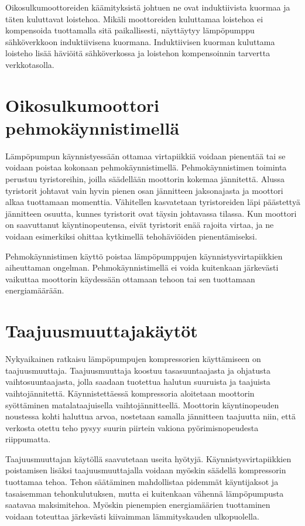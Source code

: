   Oikosulkumoottoreiden käämityksistä johtuen ne ovat induktiivista kuormaa ja täten kuluttavat loistehoa. Mikäli moottoreiden kuluttamaa loistehoa ei kompensoida tuottamalla sitä paikallisesti, näyttäytyy lämpöpumppu sähköverkkoon induktiivisena kuormana. Induktiivisen kuorman kuluttama loisteho lisää häviöitä sähköverkossa ja loistehon kompensoinnin tarvertta verkkotasolla.\parencite{pakonen} 


\section{Oikosulkumoottori pehmokäynnistimellä}
  Lämpöpumpun käynnistyessään ottamaa virtapiikkiä voidaan pienentää tai se voidaan poistaa kokonaan pehmokäynnistimellä. Pehmokäynnistimen toiminta perustuu tyristoreihin, joilla säädellään moottorin kokemaa jännitettä. Alussa tyristorit johtavat vain hyvin pienen osan jännitteen jaksonajasta ja moottori alkaa tuottamaan momenttia. Vähitellen kasvatetaan tyristoreiden läpi päästettyä jännitteen osuutta, kunnes tyristorit ovat täysin johtavassa tilassa. Kun moottori on saavuttanut käyntinopeutensa, eivät tyristorit enää rajoita virtaa, ja ne voidaan esimerkiksi ohittaa kytkimellä tehohäviöiden pienentämiseksi.\parencite{pehmokaynnistinopas}

  Pehmokäynnistimen käyttö poistaa lämpöpumppujen käynnistysvirtapiikkien aiheuttaman ongelman. Pehmokäynnistimellä ei voida kuitenkaan järkevästi vaikuttaa moottorin käydessään ottamaan tehoon tai sen tuottamaan energiamäärään.

\section{Taajuusmuuttajakäytöt}
  Nykyaikainen ratkaisu lämpöpumpujen kompressorien käyttämiseen on taajuusmuuttaja. Taajuusmuuttaja koostuu tasasuuntaajasta ja ohjatusta vaihtosuuntaajasta, jolla saadaan tuotettua halutun suuruista ja taajuista vaihtojännitettä. Käynnistettäessä kompressoria aloitetaan moottorin syöttäminen matalataajuisella vaihtojännitteellä. Moottorin käyntinopeuden noustessa kohti haluttua arvoa, nostetaan samalla jännitteen taajuutta niin, että verkosta otettu teho pysyy suurin piirtein vakiona pyörimisnopeudesta riippumatta.

  Taajuusmuuttajan käytöllä saavutetaan useita hyötyjä. Käynnistysvirtapiikkien poistamisen lisäksi taajuusmuuttajalla voidaan myöskin säädellä kompressorin tuottamaa tehoa. Tehon säätäminen mahdollistaa pidemmät käyntijaksot ja tasaisemman tehonkulutuksen, mutta ei kuitenkaan vähennä lämpöpumpusta saatavaa maksimitehoa. Myöskin pienempien energiamäärien tuottaminen voidaan toteuttaa järkevästi kiivaimman lämmityskauden ulkopuolella.

